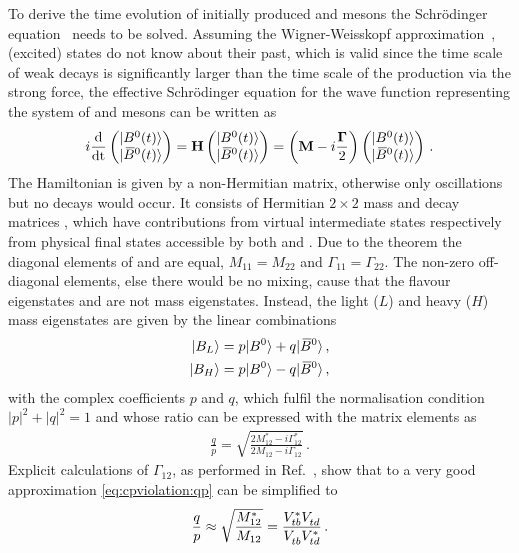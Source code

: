 To derive the time evolution of initially produced \Bd and \Bdb mesons the
Schrödinger equation~\cite{Schroedinger} needs to be solved. Assuming the
Wigner-Weisskopf approximation~\cite{Weisskopf:1930au,*Weisskopf:1930ps}, \ie
(excited) states do not know about their past, which is valid since the time
scale of weak decays is significantly larger than the time scale of the
production via the strong force, the effective Schrödinger equation for the
wave function representing the system of \Bd and \Bdb mesons can be written as
\begin{align}
	i \frac{\mathrm{d}}{\mathrm{dt}}
\begin{pmatrix}
	|{{B}^0}(t)\rangle	\\	|{{\kern 0.18em\overline{\kern -0.18em B}{}}{}^0}(t)\rangle	
\end{pmatrix}
	= \mathbf{H}
\begin{pmatrix}
	|{{B}^0}(t)\rangle	\\	|{{\kern 0.18em\overline{\kern -0.18em B}{}}{}^0}(t)\rangle	
\end{pmatrix}
	= \left(\mathbf{M} - i \frac{\mathbf{\Gamma}}{2}\right)
\begin{pmatrix}
	|{{B}^0}(t)\rangle	\\	|{{\kern 0.18em\overline{\kern -0.18em B}{}}{}^0}(t)\rangle
\end{pmatrix}
\,.
\end{align}
The Hamiltonian  is given by a non-Hermitian matrix, otherwise only
oscillations but no decays would occur. It consists of Hermitian $2\times2$
mass  and decay matrices \matr{\Gamma}, which have contributions from
virtual intermediate states respectively from physical final states accessible
by both \Bd and \Bdb. Due to the \CPT theorem the diagonal elements of
 and \matr{\Gamma} are equal, \ie $M_{11} = M_{22}$ and $\Gamma_{11} =
\Gamma_{22}$. The non-zero off-diagonal elements, else there would be no
mixing, cause that the flavour eigenstates \Bd and \Bdb are not mass
eigenstates. Instead, the light ($L$) and heavy ($H$) mass eigenstates are
given by the linear combinations
\begin{align}
\begin{split}
	|B_L\rangle = p |{{B}^0}\rangle + q |{{\kern 0.18em\overline{\kern -0.18em B}{}}{}^0}\rangle \,,\\
	|B_H\rangle = p |{{B}^0}\rangle - q |{{\kern 0.18em\overline{\kern -0.18em B}{}}{}^0}\rangle \,,
\end{split}
\label{eq:cpviolation:neutralBmesons:superposition}
\end{align}
with the complex coefficients $p$ and $q$, which fulfil the normalisation
condition $|p|^2 + |q|^2 = 1$ and whose ratio can be expressed with the matrix
elements as
\begin{align}
	\frac qp = \sqrt{\frac{2M_{12}^\ast - i\Gamma_{12}^\ast}{2M_{12} - i\Gamma_{12}}}\,.
\label{eq:cpviolation:qp}
\end{align}
Explicit calculations of $\Gamma_{12}$, as performed in
Ref.~\cite{Buras:1984pq}, show that to a very good approximation
\cref{eq:cpviolation:qp} can be simplified to
\begin{align}
	\frac qp \approx \sqrt{\frac{M_{12}^\ast}{M_{12}}} = \frac{{V_{{t}{b}}^\ast}{V_{{t}{d}}^{}}}{{V_{{t}{b}}^{}}{V_{{t}{d}}^\ast}}\,.
\label{eq:cpviolation:qp_simplified}
\end{align}

